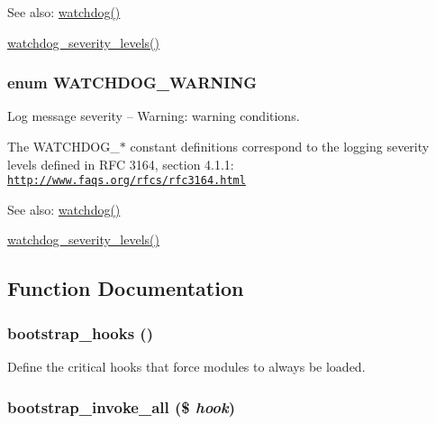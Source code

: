 \begin{Desc}
\item[See also:]\hyperlink{bootstrap_8inc_cb7338e6740302727043d64e3ae1257b}{watchdog()} 

\hyperlink{common_8inc_fb5d4b58ec7e483153644c0f664e0ca4}{watchdog\_\-severity\_\-levels()} \end{Desc}
\hypertarget{bootstrap_8inc_5361f835e10b39b553ee73c1b9414bf1}{
\subsubsection[{WATCHDOG\_\-WARNING}]{\setlength{\rightskip}{0pt plus 5cm}enum {\bf WATCHDOG\_\-WARNING}}}
\label{bootstrap_8inc_5361f835e10b39b553ee73c1b9414bf1}


Log message severity -- Warning: warning conditions.

The WATCHDOG\_\-$\ast$ constant definitions correspond to the logging severity levels defined in RFC 3164, section 4.1.1: \href{http://www.faqs.org/rfcs/rfc3164.html}{\tt http://www.faqs.org/rfcs/rfc3164.html}

\begin{Desc}
\item[See also:]\hyperlink{bootstrap_8inc_cb7338e6740302727043d64e3ae1257b}{watchdog()} 

\hyperlink{common_8inc_fb5d4b58ec7e483153644c0f664e0ca4}{watchdog\_\-severity\_\-levels()} \end{Desc}


\subsection{Function Documentation}
\hypertarget{bootstrap_8inc_7a24c0b200b76c22c63b99e935e1bd5a}{
\subsubsection[{bootstrap\_\-hooks}]{\setlength{\rightskip}{0pt plus 5cm}bootstrap\_\-hooks ()}}
\label{bootstrap_8inc_7a24c0b200b76c22c63b99e935e1bd5a}


Define the critical hooks that force modules to always be loaded. \hypertarget{bootstrap_8inc_3f13159d2e93ecfd09823d8dca30f5d9}{
\subsubsection[{bootstrap\_\-invoke\_\-all}]{\setlength{\rightskip}{0pt plus 5cm}bootstrap\_\-invoke\_\-all (\$ {\em hook})}}
\label{bootstrap_8inc_3f13159d2e93ecfd09823d8dca30f5d9}



